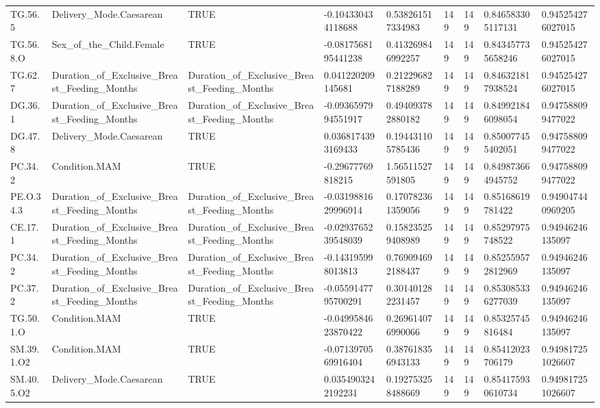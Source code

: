 \begin{longtable}{lllllllll}
TG.56.5 & Delivery\_Mode.Caesarean & TRUE & -0.104330434118688 & 0.538261517334983 & 149 & 149 & 0.846583305117131 & 0.945254276027015 \\
TG.56.8.O & Sex\_of\_the\_Child.Female & TRUE & -0.0817568195441238 & 0.413269846992257 & 149 & 149 & 0.843457735658246 & 0.945254276027015 \\
TG.62.7 & Duration\_of\_Exclusive\_Breast\_Feeding\_Months & Duration\_of\_Exclusive\_Breast\_Feeding\_Months & 0.041220209145681 & 0.212296827188289 & 149 & 149 & 0.846321817938524 & 0.945254276027015 \\
DG.36.1 & Duration\_of\_Exclusive\_Breast\_Feeding\_Months & Duration\_of\_Exclusive\_Breast\_Feeding\_Months & -0.0936597994551917 & 0.494093782880182 & 149 & 149 & 0.849921846098054 & 0.947588099477022 \\
DG.47.8 & Delivery\_Mode.Caesarean & TRUE & 0.0368174393169433 & 0.194431105785436 & 149 & 149 & 0.850077455402051 & 0.947588099477022 \\
PC.34.2 & Condition.MAM & TRUE & -0.29677769818215 & 1.56511527591805 & 149 & 149 & 0.849873664945752 & 0.947588099477022 \\
PE.O.34.3 & Duration\_of\_Exclusive\_Breast\_Feeding\_Months & Duration\_of\_Exclusive\_Breast\_Feeding\_Months & -0.0319881629996914 & 0.170782361359056 & 149 & 149 & 0.85168619781422 & 0.949047440969205 \\
CE.17.1 & Duration\_of\_Exclusive\_Breast\_Feeding\_Months & Duration\_of\_Exclusive\_Breast\_Feeding\_Months & -0.0293765239548039 & 0.158235259408989 & 149 & 149 & 0.85297975748522 & 0.94946246135097 \\
PC.34.2 & Duration\_of\_Exclusive\_Breast\_Feeding\_Months & Duration\_of\_Exclusive\_Breast\_Feeding\_Months & -0.143195998013813 & 0.769094692188437 & 149 & 149 & 0.852559572812969 & 0.94946246135097 \\
PC.37.2 & Duration\_of\_Exclusive\_Breast\_Feeding\_Months & Duration\_of\_Exclusive\_Breast\_Feeding\_Months & -0.0559147795700291 & 0.301401282231457 & 149 & 149 & 0.853085336277039 & 0.94946246135097 \\
TG.50.1.O & Condition.MAM & TRUE & -0.0499584623870422 & 0.269614076990066 & 149 & 149 & 0.85325745816484 & 0.94946246135097 \\
SM.39.1.O2 & Condition.MAM & TRUE & -0.0713970569916404 & 0.387618356943133 & 149 & 149 & 0.85412023706179 & 0.949817251026607 \\
SM.40.5.O2 & Delivery\_Mode.Caesarean & TRUE & 0.0354903242192231 & 0.192753258488669 & 149 & 149 & 0.854175930610734 & 0.949817251026607 \\

\end{longtable}
